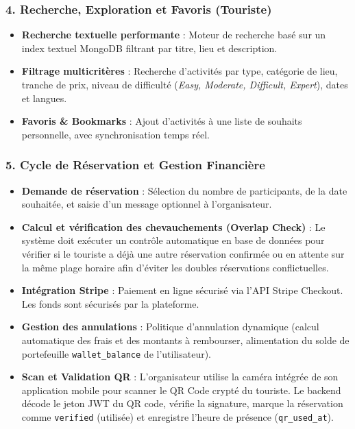 \documentclass[12pt,a4paper]{report}
\begin{document}
\subsubsection{4. Recherche, Exploration et Favoris (Touriste)}
\begin{itemize}[label=\textbullet]
    \item \textbf{Recherche textuelle performante} : Moteur de recherche basé sur un index textuel MongoDB filtrant par titre, lieu et description.
    \item \textbf{Filtrage multicritères} : Recherche d'activités par type, catégorie de lieu, tranche de prix, niveau de difficulté (\textit{Easy, Moderate, Difficult, Expert}), dates et langues.
    \item \textbf{Favoris \& Bookmarks} : Ajout d'activités à une liste de souhaits personnelle, avec synchronisation temps réel.
\end{itemize}

\subsubsection{5. Cycle de Réservation et Gestion Financière}
\begin{itemize}[label=\textbullet]
    \item \textbf{Demande de réservation} : Sélection du nombre de participants, de la date souhaitée, et saisie d'un message optionnel à l'organisateur.
    \item \textbf{Calcul et vérification des chevauchements (Overlap Check)} : Le système doit exécuter un contrôle automatique en base de données pour vérifier si le touriste a déjà une autre réservation confirmée ou en attente sur la même plage horaire afin d'éviter les doubles réservations conflictuelles.
    \item \textbf{Intégration Stripe} : Paiement en ligne sécurisé via l'API Stripe Checkout. Les fonds sont sécurisés par la plateforme.
    \item \textbf{Gestion des annulations} : Politique d'annulation dynamique (calcul automatique des frais et des montants à rembourser, alimentation du solde de portefeuille \texttt{wallet\_balance} de l'utilisateur).
    \item \textbf{Scan et Validation QR} : L'organisateur utilise la caméra intégrée de son application mobile pour scanner le QR Code crypté du touriste. Le backend décode le jeton JWT du QR code, vérifie la signature, marque la réservation comme \texttt{verified} (utilisée) et enregistre l'heure de présence (\texttt{qr\_used\_at}).
\end{itemize}
\end{document}
